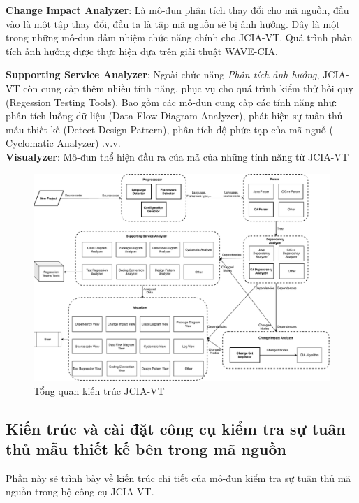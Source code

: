 \documentclass[12pt]{report}
\begin{document}
\noindent \textbf{Change Impact Analyzer}: Là mô-đun phân tích thay đổi cho mã nguồn, đầu vào là một tập thay đổi, đầu ta là tập mã nguồn sẽ bị ảnh hưởng. Đây là một trong những mô-đun đảm nhiệm chức năng chính cho JCIA-VT. Quá trình phân tích ảnh hưởng được thực hiện dựa trên giải thuật WAVE-CIA.

\noindent \textbf{Supporting Service Analyzer}: Ngoài chức năng \textit{Phân tích ảnh hưởng}, JCIA-VT còn cung cấp thêm nhiều tính năng, phục vụ cho quá trình kiểm thử hồi quy (Regession Testing Tools). Bao gồm các mô-đun cung cấp các tính năng như: phân tích luồng dữ liệu (Data Flow Diagram Analyzer), phát hiện sự tuân thủ mẫu thiết kế (Detect Design Pattern), phân tích độ phức tạp của mã nguồ ( Cyclomatic Analyzer) .v.v.\\
\textbf{Visualyzer}: Mô-đun thể hiện đầu ra của mã của những tính năng từ JCIA-VT 
\begin{figure}[h]
	\centering
	\includegraphics[scale=0.19]{images/architexture}
	\caption{Tổng quan kiến trúc JCIA-VT}
	\label{fig:architexture}
\end{figure}
\subsection{Kiến trúc và cài đặt công cụ kiểm tra sự tuân thủ mẫu thiết kế bên trong mã nguồn}
Phần này sẽ trình bày về kiến trúc chi tiết của mô-đun kiểm tra sự tuân thủ mã nguồn trong bộ công cụ JCIA-VT.
\end{document}

